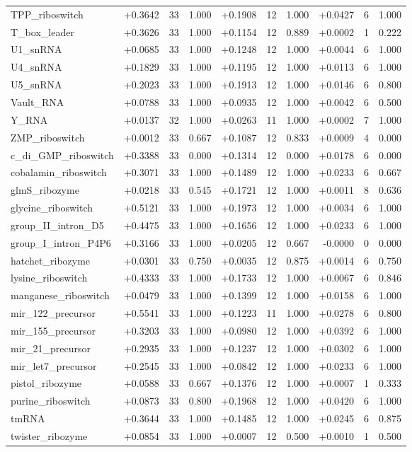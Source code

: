 \begin{longtable}{@{}lrrrrrrrrr@{}}
TPP\_riboswitch & +0.3642 & 33 & 1.000 & +0.1908 & 12 & 1.000 & +0.0427 & 6 & 1.000 \\
T\_box\_leader & +0.3626 & 33 & 1.000 & +0.1154 & 12 & 0.889 & +0.0002 & 1 & 0.222 \\
U1\_snRNA & +0.0685 & 33 & 1.000 & +0.1248 & 12 & 1.000 & +0.0044 & 6 & 1.000 \\
U4\_snRNA & +0.1829 & 33 & 1.000 & +0.1195 & 12 & 1.000 & +0.0113 & 6 & 1.000 \\
U5\_snRNA & +0.2023 & 33 & 1.000 & +0.1913 & 12 & 1.000 & +0.0146 & 6 & 0.800 \\
Vault\_RNA & +0.0788 & 33 & 1.000 & +0.0935 & 12 & 1.000 & +0.0042 & 6 & 0.500 \\
Y\_RNA & +0.0137 & 32 & 1.000 & +0.0263 & 11 & 1.000 & +0.0002 & 7 & 1.000 \\
ZMP\_riboswitch & +0.0012 & 33 & 0.667 & +0.1087 & 12 & 0.833 & +0.0009 & 4 & 0.000 \\
c\_di\_GMP\_riboswitch & +0.3388 & 33 & 0.000 & +0.1314 & 12 & 0.000 & +0.0178 & 6 & 0.000 \\
cobalamin\_riboswitch & +0.3071 & 33 & 1.000 & +0.1489 & 12 & 1.000 & +0.0233 & 6 & 0.667 \\
glmS\_ribozyme & +0.0218 & 33 & 0.545 & +0.1721 & 12 & 1.000 & +0.0011 & 8 & 0.636 \\
glycine\_riboswitch & +0.5121 & 33 & 1.000 & +0.1973 & 12 & 1.000 & +0.0034 & 6 & 1.000 \\
group\_II\_intron\_D5 & +0.4475 & 33 & 1.000 & +0.1656 & 12 & 1.000 & +0.0233 & 6 & 1.000 \\
group\_I\_intron\_P4P6 & +0.3166 & 33 & 1.000 & +0.0205 & 12 & 0.667 & -0.0000 & 0 & 0.000 \\
hatchet\_ribozyme & +0.0301 & 33 & 0.750 & +0.0035 & 12 & 0.875 & +0.0014 & 6 & 0.750 \\
lysine\_riboswitch & +0.4333 & 33 & 1.000 & +0.1733 & 12 & 1.000 & +0.0067 & 6 & 0.846 \\
manganese\_riboswitch & +0.0479 & 33 & 1.000 & +0.1399 & 12 & 1.000 & +0.0158 & 6 & 1.000 \\
mir\_122\_precursor & +0.5541 & 33 & 1.000 & +0.1223 & 11 & 1.000 & +0.0278 & 6 & 0.800 \\
mir\_155\_precursor & +0.3203 & 33 & 1.000 & +0.0980 & 12 & 1.000 & +0.0392 & 6 & 1.000 \\
mir\_21\_precursor & +0.2935 & 33 & 1.000 & +0.1237 & 12 & 1.000 & +0.0302 & 6 & 1.000 \\
mir\_let7\_precursor & +0.2545 & 33 & 1.000 & +0.0842 & 12 & 1.000 & +0.0233 & 6 & 1.000 \\
pistol\_ribozyme & +0.0588 & 33 & 0.667 & +0.1376 & 12 & 1.000 & +0.0007 & 1 & 0.333 \\
purine\_riboswitch & +0.0873 & 33 & 0.800 & +0.1968 & 12 & 1.000 & +0.0420 & 6 & 1.000 \\
tmRNA & +0.3644 & 33 & 1.000 & +0.1485 & 12 & 1.000 & +0.0245 & 6 & 0.875 \\
twister\_ribozyme & +0.0854 & 33 & 1.000 & +0.0007 & 12 & 0.500 & +0.0010 & 1 & 0.500 \\
\bottomrule
\end{longtable}
\normalsize
